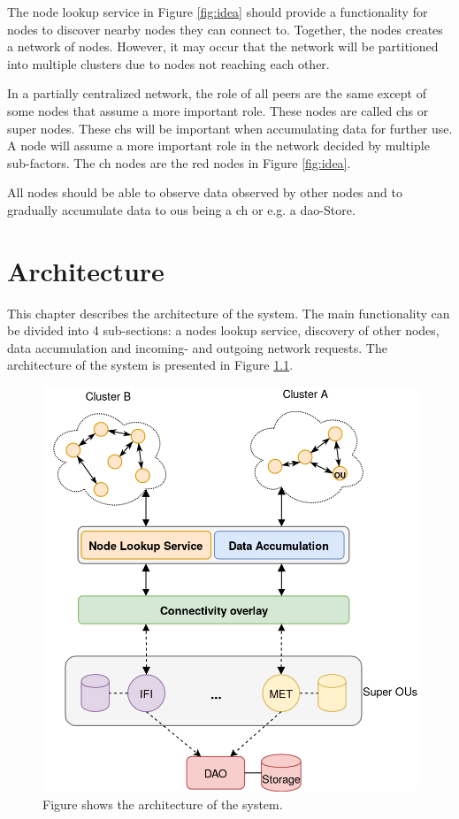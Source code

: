 \documentclass[USenglish]{uit-thesis}
\begin{document}
The node lookup service in Figure \ref{fig:idea} should provide a functionality for nodes to discover nearby nodes they can connect to. Together, the nodes creates a network of nodes. However, it may occur that the network will be partitioned into multiple clusters due to nodes not reaching each other.

In a partially centralized network, the role of all peers are the same except of some nodes that assume a more important role. These nodes are called \glspl{ch} or super nodes. These \glspl{ch} will be important when accumulating data for further use. A node will assume a more important role in the network decided by multiple sub-factors. The \gls{ch} nodes are the red nodes in Figure \ref{fig:idea}.

All nodes should be able to observe data observed by other nodes and to gradually accumulate data to \glspl{ou} being a \gls{ch} or e.g. a \gls{dao}-Store.





\chapter{Architecture}
\glsresetall

This chapter describes the architecture of the system. The main functionality can be divided into 4 sub-sections: a nodes lookup service, discovery of other nodes, data accumulation and incoming- and outgoing network requests. The architecture of the system is presented in Figure \ref{fig:architecture3}.


\begin{figure}
\centering
\includegraphics[width=\textwidth]{arch3.png}
\caption{Figure shows the architecture of the system.}
\label{fig:architecture3}
\end{figure}
\end{document}
